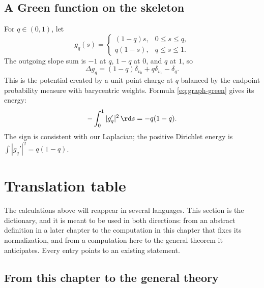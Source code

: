 \subsection{A Green function on the skeleton}

For $q\in(0,1)$, let
\[
 g_q(s)=
 \begin{cases}
  (1-q)s,&0\leq s\leq q,\\
  q(1-s),&q\leq s\leq1.
 \end{cases}
\]
The outgoing slope sum is $-1$ at $q$, $1-q$ at $0$, and $q$ at $1$, so
\begin{equation}
\label{eq:segment-green}
                 \Delta g_q=(1-q)\delta_{v_0}+q\delta_{v_1}-\delta_q.
\end{equation}
This is the potential created by a unit point charge at $q$ balanced by the
endpoint probability measure with barycentric weights.  Formula
\eqref{eq:graph-green} gives its energy:
\[
 -\int_0^1|g_q'|^2\,\rd s=-q(1-q).
\]
The sign is consistent with our Laplacian; the positive Dirichlet energy is
$\int|g_q'|^2=q(1-q)$.

\section{Translation table}
\label{sec:model-translation-table}

The calculations above will reappear in several languages.  This section is
the dictionary, and it is meant to be used in both directions: from an
abstract definition in a later chapter to the computation in this chapter
that fixes its normalization, and from a computation here to the general
theorem it anticipates.  Every entry points to an existing statement.

\subsection{From this chapter to the general theory}
\label{sec:ch08-dict-forward}

